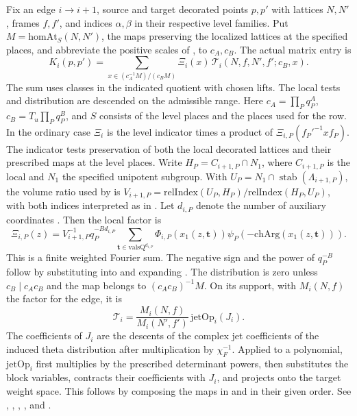 Fix an edge \(i\to i+1\), source and target decorated points \(p,p'\) with lattices \(N,N'\), frames \(f,f'\), and indices \(\alpha,\beta\) in their respective level families. Put \(M=\mathrm{homAt}_S(N,N')\), the maps preserving the localized lattices at the specified places, and abbreviate the positive scales of ,  to \(c_A,c_B\). The actual matrix entry is
\begin{equation}\label{geo:chain-entry}
 K_i(p,p')=\sum_{x\in(c_A^{-1}M)/(c_BM)}
              \Xi_i(x)\,\mathcal T_i(N,f,N',f';c_B,x).
\end{equation}
The sum uses classes in the indicated quotient with chosen lifts. The local tests and distribution are descended on the admissible range. Here \(c_A=\prod_P q_P^{A}\), \(c_B=T_u\prod_P q_P^{B}\), and \(S\) consists of the level places and the places used for the row. In the ordinary case \(\Xi_i\) is the level indicator times a product of \(\Xi_{i,P}(f_P'^{-1}xf_P)\). The indicator tests preservation of both the local decorated lattices and their prescribed maps at the level places. Write \(H_P=C_{i+1,P}\cap N_1\), where \(C_{i+1,P}\) is the local  and \(N_1\) the specified unipotent subgroup. With \(U_P=N_1\cap\operatorname{stab}(\Lambda_{i+1,P})\), the volume ratio used by  is \(V_{i+1,P}=\mathrm{relIndex}(U_P,H_P)/\mathrm{relIndex}(H_P,U_P)\), with both indices interpreted as in . Let \(d_{i,P}\) denote the number of auxiliary coordinates .  Then the local factor is
\[
 \Xi_{i,P}(z)=V_{i+1,P}^{-1}q_P^{-B d_{i,P}}
   \sum_{\mathbf t\in\mathrm{valsQ}^{d_{i,P}}}
     \Phi_{i,P}(x_1(z,\mathbf t))
       \psi_P(-\mathrm{chArg}(x_1(z,\mathbf t))).
\]
This is a finite weighted Fourier sum. The negative sign and the power of \(q_P^{-B}\) follow by substituting  into  and expanding . The distribution is zero unless \(c_B\mid c_Ac_B\) and the map belongs to \((c_Ac_B)^{-1}M\). On its support, with \(M_i(N,f)\) the  factor for the edge, it is
\[
 \mathcal T_i=
 \frac{M_i(N,f)}{M_i(N',f')}\,
          \mathrm{jetOp}_{i}(J_i).
\]
The coefficients of \(J_i\) are the descents of the complex jet coefficients of the induced theta distribution after multiplication by \(\chi_F^{-1}\). Applied to a polynomial, \(\mathrm{jetOp}_{i}\) first multiplies by the prescribed determinant powers, then substitutes the block variables, contracts their coefficients with \(J_i\), and projects onto the target weight space. This follows by composing the maps in  and  in their given order. See , , , , and .

